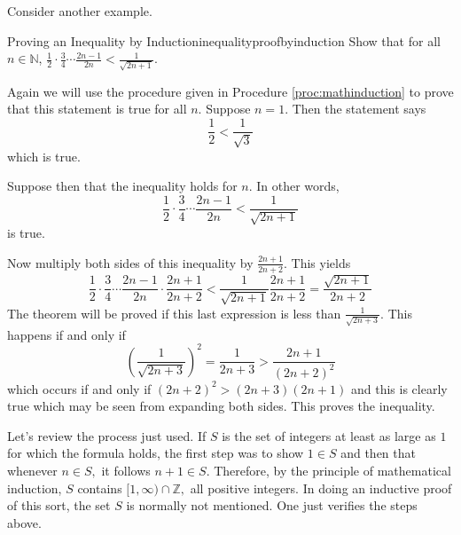 Consider another example.

\begin{example}{Proving an Inequality by Induction}{inequalityproofbyinduction}
Show that for all $n\in \mathbb{N}$, $\displaystyle \frac{1}{2}\cdot 
\displaystyle \frac{3}{4}\cdots \displaystyle \frac{2n-1}{2n}<\displaystyle
\frac{1}{\sqrt{2n+1}}.$
\end{example}

\begin{solution}
Again we will use the procedure given in Procedure \ref{proc:mathinduction} to prove that this statement is true for all $n$.
Suppose $n=1$. Then the statement says 
\begin{equation*}
\frac{1}{2}< \frac{1}{\sqrt{3}}
\end{equation*}
 which is true. 

Suppose then that
the inequality holds for $n.$ In other words, 
\begin{equation*}
 \frac{1}{2}\cdot \frac{3}{4}\cdots \frac{2n-1}{2n} < \frac{1}{\sqrt{2n+1}}
\end{equation*}
is true.

Now multiply both sides of this inequality by $\frac{2n+1}{2n+2}$.
This yields
\begin{equation*}
\frac{1}{2}\cdot \frac{3}{4}\cdots \frac{2n-1}{2n}\cdot \frac{2n+1}{2n+2}<
\frac{1}{\sqrt{2n+1}}\frac{2n+1}{2n+2}=\frac{\sqrt{2n+1}}{2n+2}
\end{equation*}
The theorem will be proved if this last expression is less than $
\displaystyle\frac{1}{\sqrt{2n+3}}.$ This happens if and only if
\begin{equation*}
\left( \frac{1}{\sqrt{2n+3}}\right) ^{2}=\frac{1}{2n+3}>\frac{2n+1}{\left(
2n+2\right) ^{2}}
\end{equation*}
which occurs if and only if $\left( 2n+2\right) ^{2}>\left( 2n+3\right)
\left( 2n+1\right) $ and this is clearly true which may be seen from
expanding both sides. This proves the inequality.
\end{solution}

Let's review the process just used. If $S$ is the set of integers at least as
large as $1$ for which the formula holds, the first step was to show $1\in S$
and then that whenever $n\in S,$ it follows $n+1\in S.$ Therefore, by the
principle of mathematical induction, $S$ contains $[1,\infty )\cap \mathbb{Z}
,$ all positive integers. In doing an inductive proof of this sort, the set $
S$ is normally not mentioned. One just verifies the steps above. 
